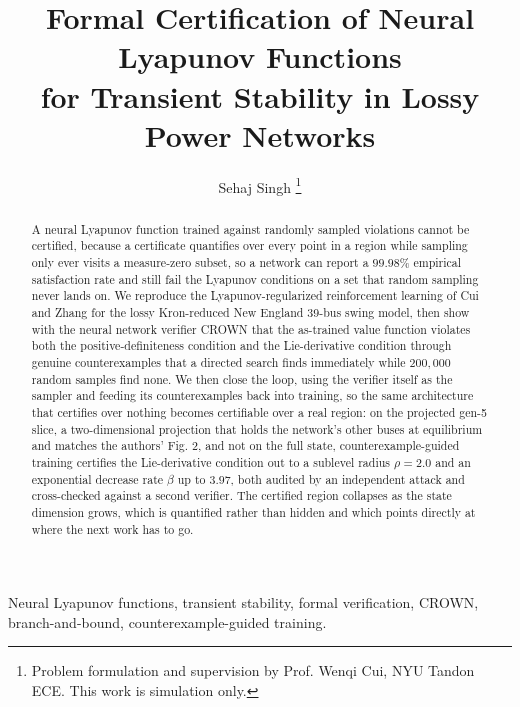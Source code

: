 \documentclass[letterpaper,journal]{IEEEtran}
\begin{document}
\title{Formal Certification of Neural Lyapunov Functions\\ for Transient Stability in Lossy Power Networks}

\author{Sehaj Singh%
\thanks{Problem formulation and supervision by Prof. Wenqi Cui, NYU Tandon ECE.
This work is simulation only.}}

\maketitle

\begin{abstract}
A neural Lyapunov function trained against randomly sampled violations cannot be
certified, because a certificate quantifies over every point in a region while
sampling only ever visits a measure-zero subset, so a network can report a
$99.98\%$ empirical satisfaction rate and still fail the Lyapunov conditions on a
set that random sampling never lands on. We reproduce the Lyapunov-regularized
reinforcement learning of Cui and Zhang for the lossy Kron-reduced New England
39-bus swing model, then show with the neural network verifier CROWN that the
as-trained value function violates both the positive-definiteness condition and
the Lie-derivative condition through genuine counterexamples that a directed
search finds immediately while $200{,}000$ random samples find none. We then close
the loop, using the verifier itself as the sampler and feeding its
counterexamples back into training, so the same architecture that certifies over
nothing becomes certifiable over a real region: on the projected gen-5 slice, a
two-dimensional projection that holds the network's other buses at equilibrium and
matches the authors' Fig. 2, and not on the full state, counterexample-guided
training certifies the Lie-derivative condition out to a sublevel radius $\rho=2.0$
and an exponential decrease rate $\beta$ up to $3.97$, both audited by an
independent attack and cross-checked against a second verifier. The certified
region collapses as the state dimension grows, which is quantified rather than
hidden and which points directly at where the next work has to go.
\end{abstract}

\begin{IEEEkeywords}
Neural Lyapunov functions, transient stability, formal verification, CROWN,
branch-and-bound, counterexample-guided training.
\end{IEEEkeywords}
\end{document}
